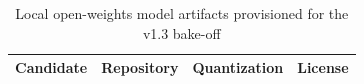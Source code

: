 
\begin{table}[htbp]
\centering
\caption{Local open-weights model artifacts provisioned for the v1.3 bake-off}
\label{tab:local-model-artifacts}
\begin{tabular}{llll}
\hline
Candidate & Repository & Quantization & License \\
\hline
\hline
\end{tabular}
\end{table}
